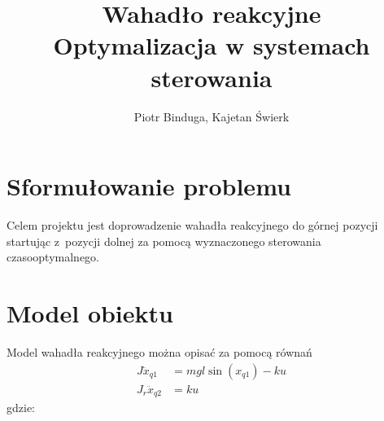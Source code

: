 \documentclass[11pt]{mwart}
\begin{document}
\author{Piotr Binduga, Kajetan Świerk}
\title{\Huge{Wahadło reakcyjne} \\ \vspace{0.2cm} \small{Optymalizacja w systemach sterowania}}

\maketitle
\tableofcontents{}
\newpage{}

\section{Sformułowanie problemu}
Celem projektu jest doprowadzenie wahadła reakcyjnego do górnej pozycji startując z~pozycji dolnej za pomocą wyznaczonego sterowania czasooptymalnego. 

\section{Model obiektu}
Model wahadła reakcyjnego można opisać za pomocą równań
\begin{equation}
	\begin{split}
		J\ddot{x}_{q1} &=  mgl\sin\left({x_{q1}}\right)-ku \\
		J_{r}\ddot{x}_{q2} &= ku
	\end{split}
\end{equation}
gdzie:
\end{document}
